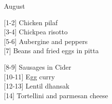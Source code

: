 		\begin{menu}{August}
    
    \begin{recipelist}
    
        {\scriptsize[1-2]} Chicken pilaf\\
        {\scriptsize[3-4]} Chickpea risotto\\
        {\scriptsize[5-6]} Aubergine and peppers\\
        {\scriptsize[7]} Beans and fried eggs in pitta\\%
    \end{recipelist}%
    \begin{recipelist}
    
        {\scriptsize[8-9]} Sausages in Cider\\
        {\scriptsize[10-11]} Egg curry\\
        {\scriptsize[12-13]} Lentil dhansak\\
        {\scriptsize[14]} Tortellini and parmesan cheese\\%
    \end{recipelist}\par%
  

\end{menu}
